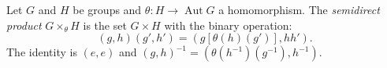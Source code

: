 Let $G$ and $H$ be groups and $\theta: H \to \operatorname{Aut} G$ a homomorphism. The \emph{semidirect product} $G \times_{\theta} H$ is the set $G \times H$ with the binary operation:
$$(g,h)(g',h') = (g[\theta(h)(g')], hh').$$
The identity is $(e,e)$ and $(g,h)^{-1} = (\theta(h^{-1})(g^{-1}), h^{-1})$.
